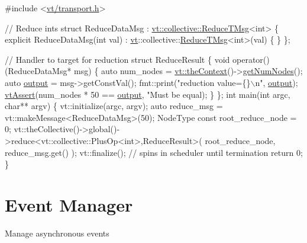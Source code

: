 \begin{DoxyCode}
\textcolor{preprocessor}{#include <\hyperlink{transport_8h}{vt/transport.h}>}

\textcolor{comment}{// Reduce ints}
\textcolor{keyword}{struct }ReduceDataMsg : \hyperlink{structvt_1_1collective_1_1reduce_1_1operators_1_1_reduce_t_msg}{vt::collective::ReduceTMsg}<int> \{
  \textcolor{keyword}{explicit} ReduceDataMsg(\textcolor{keywordtype}{int} val)
    : \hyperlink{namespacevt}{vt}::collective::\hyperlink{namespacevt_1_1collective_a28b82d5d48c9bc6e4fd738fcbf9e0f62}{ReduceTMsg}<int>(val)
  \{ \}
\};

\textcolor{comment}{// Handler to target for reduction}
\textcolor{keyword}{struct }ReduceResult \{
  \textcolor{keywordtype}{void} operator()(ReduceDataMsg* msg) \{
    \textcolor{keyword}{auto} num\_nodes = \hyperlink{namespacevt_a26551fe0e6e6a1371111df5b12c7e92c}{vt::theContext}()->\hyperlink{structvt_1_1ctx_1_1_context_a7f41071aadf6d5fa9e1b6c703c5ff19d}{getNumNodes}();
    \textcolor{keyword}{auto} \hyperlink{namespacevt_ad3ca3e8710dd3c8badff897f8de3c858}{output} = msg->getConstVal();
    fmt::print(\textcolor{stringliteral}{"reduction value=\{\}\(\backslash\)n"}, \hyperlink{namespacevt_ad3ca3e8710dd3c8badff897f8de3c858}{output});
    \hyperlink{config__assert_8h_aeddd4990a496e91a0ca5d6c16437359b}{vtAssert}(num\_nodes * 50 == \hyperlink{namespacevt_ad3ca3e8710dd3c8badff897f8de3c858}{output}, \textcolor{stringliteral}{"Must be equal);}
\textcolor{stringliteral}{  \}}
\textcolor{stringliteral}{\};}
\textcolor{stringliteral}{}
\textcolor{stringliteral}{int main(int argc, char** argv) \{}
\textcolor{stringliteral}{  vt::initialize(argc, argv);}
\textcolor{stringliteral}{}
\textcolor{stringliteral}{  auto reduce\_msg = vt::makeMessage<ReduceDataMsg>(50);}
\textcolor{stringliteral}{}
\textcolor{stringliteral}{  NodeType const root\_reduce\_node = 0;}
\textcolor{stringliteral}{  vt::theCollective()->global()->reduce<vt::collective::PlusOp<int>,ReduceResult>(}
\textcolor{stringliteral}{    root\_reduce\_node, reduce\_msg.get()}
\textcolor{stringliteral}{  );}
\textcolor{stringliteral}{}
\textcolor{stringliteral}{  vt::finalize(); // spins in scheduler until termination}
\textcolor{stringliteral}{  return 0;}
\textcolor{stringliteral}{\}}
\end{DoxyCode}
 \hypertarget{event}{}\section{Event Manager}\label{event}
Manage asynchronous events

